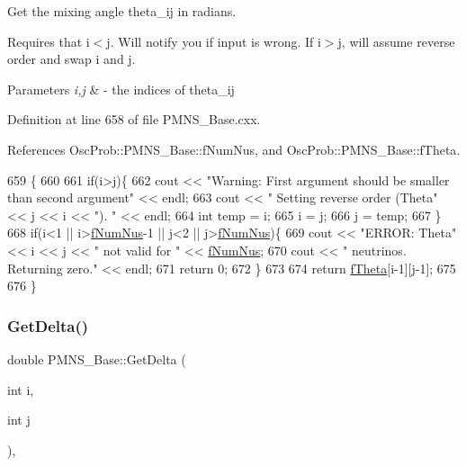 Get the mixing angle theta\+\_\+ij in radians.

Requires that i$<$j. Will notify you if input is wrong. If i$>$j, will assume reverse order and swap i and j.


\begin{DoxyParams}{Parameters}
{\em i,j} & -\/ the indices of theta\+\_\+ij \\
\hline
\end{DoxyParams}


Definition at line 658 of file P\+M\+N\+S\+\_\+\+Base.\+cxx.



References Osc\+Prob\+::\+P\+M\+N\+S\+\_\+\+Base\+::f\+Num\+Nus, and Osc\+Prob\+::\+P\+M\+N\+S\+\_\+\+Base\+::f\+Theta.


\begin{DoxyCode}
659 \{
660 
661   \textcolor{keywordflow}{if}(i>j)\{
662     cout << \textcolor{stringliteral}{"Warning: First argument should be smaller than second argument"} << endl;
663     cout << \textcolor{stringliteral}{"         Setting reverse order (Theta"} << j << i << \textcolor{stringliteral}{"). "} << endl;
664     \textcolor{keywordtype}{int} temp = i;
665     i = j;
666     j = temp;
667   \}
668   \textcolor{keywordflow}{if}(i<1 || i>\hyperlink{classOscProb_1_1PMNS__Base_a24bb74bed63569dfe88b18fa6a08060e}{fNumNus}-1 || j<2 || j>\hyperlink{classOscProb_1_1PMNS__Base_a24bb74bed63569dfe88b18fa6a08060e}{fNumNus})\{
669     cout << \textcolor{stringliteral}{"ERROR: Theta"} << i << j << \textcolor{stringliteral}{" not valid for "} << \hyperlink{classOscProb_1_1PMNS__Base_a24bb74bed63569dfe88b18fa6a08060e}{fNumNus};
670     cout << \textcolor{stringliteral}{" neutrinos. Returning zero."} << endl;
671     \textcolor{keywordflow}{return} 0;
672   \}
673 
674   \textcolor{keywordflow}{return} \hyperlink{classOscProb_1_1PMNS__Base_a1976887cd658dd86b2336c181f1470b4}{fTheta}[i-1][j-1];
675 
676 \}
\end{DoxyCode}
\mbox{\label{classOscProb_1_1PMNS__Base_adb8dbc91d4286d2e7c8f768c59476241}} 
\subsubsection{\texorpdfstring{Get\+Delta()}{GetDelta()}}
{\footnotesize\ttfamily double P\+M\+N\+S\+\_\+\+Base\+::\+Get\+Delta (\begin{DoxyParamCaption}\item[{int}]{i,  }\item[{int}]{j }\end{DoxyParamCaption})\hspace{0.3cm}{\ttfamily [virtual]}, {\ttfamily [inherited]}}

